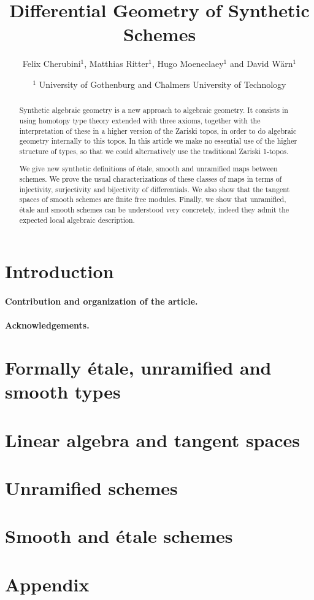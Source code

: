 \documentclass{../util/zariski}
\title{Differential Geometry of Synthetic Schemes}
\author{Felix Cherubini$^1$, Matthias Ritter$^1$, Hugo Moeneclaey$^1$ and David Wärn$^1$}
\date{$^1$ University of Gothenburg and Chalmers University of Technology }
\begin{document}
\maketitle

\begin{abstract}
  Synthetic algebraic geometry is a new approach to algebraic geometry. It consists in using homotopy type theory extended with three axioms, together with the interpretation of these in a higher version of the Zariski topos, in order to do algebraic geometry internally to this topos. In this article we make no essential use of the higher structure of types, so that we could alternatively use the traditional Zariski 1-topos.
  
  We give new synthetic definitions of étale, smooth and unramified maps between schemes.
  We prove the usual characterizations of these classes of maps in terms of injectivity, surjectivity and bijectivity of differentials. We also show that the tangent spaces of smooth schemes are finite free modules.
  Finally, we show that unramified, étale and smooth schemes can be understood very concretely, indeed they admit the expected local algebraic description.
\end{abstract}

\tableofcontents

\section*{Introduction}

\paragraph{Contribution and organization of the article. }

\paragraph{Acknowledgements. }


\section{Formally étale, unramified and smooth types}


\section{Linear algebra and tangent spaces}


\section{Unramified schemes}


\section{Smooth and étale schemes}


\pagebreak
\appendix
\section{Appendix}


\printindex

\printbibliography
\end{document}
